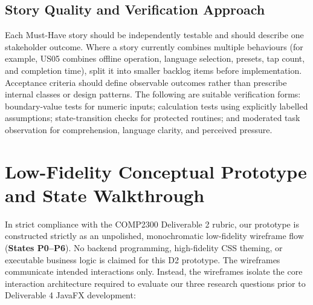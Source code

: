 \documentclass[12pt, a4paper]{article}
\begin{document}
\clearpage


\subsection{Story Quality and Verification Approach}
Each Must-Have story should be independently testable and should describe one stakeholder outcome. Where a story currently combines multiple behaviours (for example, US05 combines offline operation, language selection, presets, tap count, and completion time), split it into smaller backlog items before implementation. Acceptance criteria should define observable outcomes rather than prescribe internal classes or design patterns. The following are suitable verification forms: boundary-value tests for numeric inputs; calculation tests using explicitly labelled assumptions; state-transition checks for protected routines; and moderated task observation for comprehension, language clarity, and perceived pressure.

\section{Low-Fidelity Conceptual Prototype and State Walkthrough}
In strict compliance with the COMP2300 Deliverable 2 rubric, our prototype is constructed strictly as an unpolished, monochromatic low-fidelity wireframe flow (\textbf{States P0--P6}). No backend programming, high-fidelity CSS theming, or executable business logic is claimed for this D2 prototype. The wireframes communicate intended interactions only. Instead, the wireframes isolate the core interaction architecture required to evaluate our three research questions prior to Deliverable 4 JavaFX development:
\end{document}
